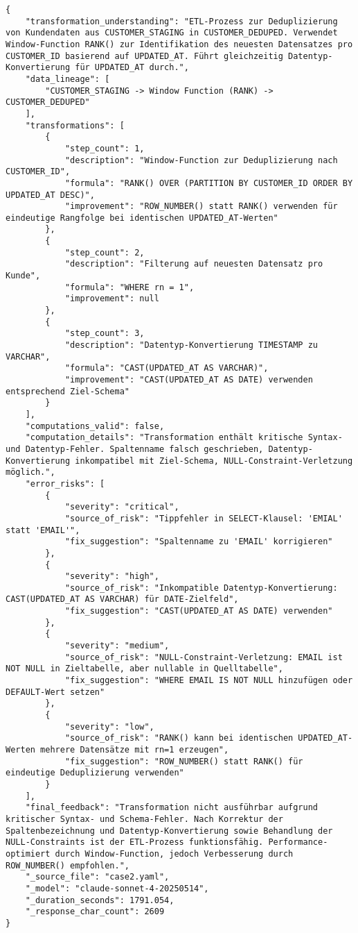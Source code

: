 \begin{lstlisting}[caption={Ausgabe: Claude Sonnet 4 Anwendungsfall 2 Konsistenzdurchlauf},label={claude_case2_prompt2}]
{
    "transformation_understanding": "ETL-Prozess zur Deduplizierung von Kundendaten aus CUSTOMER_STAGING in CUSTOMER_DEDUPED. Verwendet Window-Function RANK() zur Identifikation des neuesten Datensatzes pro CUSTOMER_ID basierend auf UPDATED_AT. Führt gleichzeitig Datentyp-Konvertierung für UPDATED_AT durch.",
    "data_lineage": [
        "CUSTOMER_STAGING -> Window Function (RANK) -> CUSTOMER_DEDUPED"
    ],
    "transformations": [
        {
            "step_count": 1,
            "description": "Window-Function zur Deduplizierung nach CUSTOMER_ID",
            "formula": "RANK() OVER (PARTITION BY CUSTOMER_ID ORDER BY UPDATED_AT DESC)",
            "improvement": "ROW_NUMBER() statt RANK() verwenden für eindeutige Rangfolge bei identischen UPDATED_AT-Werten"
        },
        {
            "step_count": 2,
            "description": "Filterung auf neuesten Datensatz pro Kunde",
            "formula": "WHERE rn = 1",
            "improvement": null
        },
        {
            "step_count": 3,
            "description": "Datentyp-Konvertierung TIMESTAMP zu VARCHAR",
            "formula": "CAST(UPDATED_AT AS VARCHAR)",
            "improvement": "CAST(UPDATED_AT AS DATE) verwenden entsprechend Ziel-Schema"
        }
    ],
    "computations_valid": false,
    "computation_details": "Transformation enthält kritische Syntax- und Datentyp-Fehler. Spaltenname falsch geschrieben, Datentyp-Konvertierung inkompatibel mit Ziel-Schema, NULL-Constraint-Verletzung möglich.",
    "error_risks": [
        {
            "severity": "critical",
            "source_of_risk": "Tippfehler in SELECT-Klausel: 'EMIAL' statt 'EMAIL'",
            "fix_suggestion": "Spaltenname zu 'EMAIL' korrigieren"
        },
        {
            "severity": "high",
            "source_of_risk": "Inkompatible Datentyp-Konvertierung: CAST(UPDATED_AT AS VARCHAR) für DATE-Zielfeld",
            "fix_suggestion": "CAST(UPDATED_AT AS DATE) verwenden"
        },
        {
            "severity": "medium",
            "source_of_risk": "NULL-Constraint-Verletzung: EMAIL ist NOT NULL in Zieltabelle, aber nullable in Quelltabelle",
            "fix_suggestion": "WHERE EMAIL IS NOT NULL hinzufügen oder DEFAULT-Wert setzen"
        },
        {
            "severity": "low",
            "source_of_risk": "RANK() kann bei identischen UPDATED_AT-Werten mehrere Datensätze mit rn=1 erzeugen",
            "fix_suggestion": "ROW_NUMBER() statt RANK() für eindeutige Deduplizierung verwenden"
        }
    ],
    "final_feedback": "Transformation nicht ausführbar aufgrund kritischer Syntax- und Schema-Fehler. Nach Korrektur der Spaltenbezeichnung und Datentyp-Konvertierung sowie Behandlung der NULL-Constraints ist der ETL-Prozess funktionsfähig. Performance-optimiert durch Window-Function, jedoch Verbesserung durch ROW_NUMBER() empfohlen.",
    "_source_file": "case2.yaml",
    "_model": "claude-sonnet-4-20250514",
    "_duration_seconds": 1791.054,
    "_response_char_count": 2609
}
\end{lstlisting}

